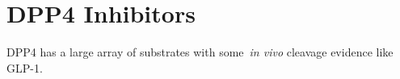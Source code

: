 \section{DPP4 Inhibitors}
DPP4 has a large array of substrates with some~\textit{in vivo} cleavage evidence like GLP-1. 